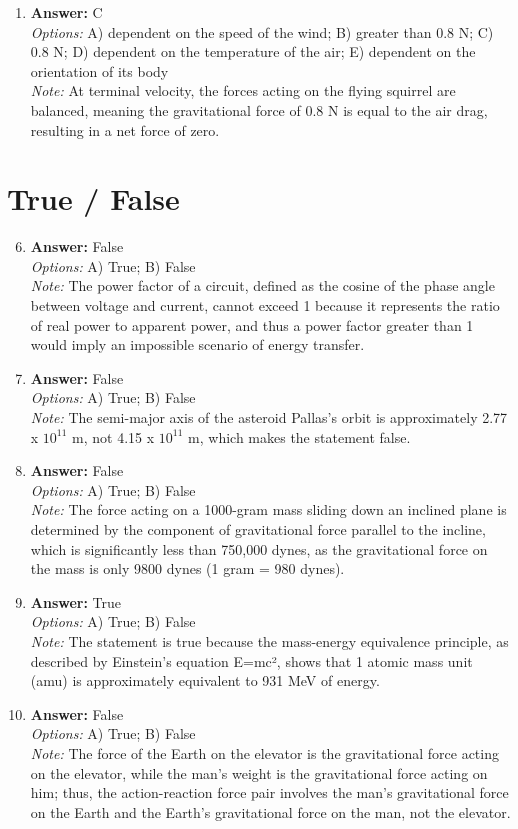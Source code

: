 \documentclass[12pt]{article}
\begin{document}
\begin{enumerate}[label=\arabic*.]
\item \textbf{Answer:} C
\\ \textit{Options:} A) dependent on the speed of the wind; B) greater than 0.8 N; C) 0.8 N; D) dependent on the temperature of the air; E) dependent on the orientation of its body
\\ \textit{Note:} At terminal velocity, the forces acting on the flying squirrel are balanced, meaning the gravitational force of 0.8 N is equal to the air drag, resulting in a net force of zero.
\end{enumerate}

\section*{True / False}
\begin{enumerate}[label=\arabic*.]
\setcounter{enumi}{5}
\item \textbf{Answer:} False
\\ \textit{Options:} A) True; B) False
\\ \textit{Note:} The power factor of a circuit, defined as the cosine of the phase angle between voltage and current, cannot exceed 1 because it represents the ratio of real power to apparent power, and thus a power factor greater than 1 would imply an impossible scenario of energy transfer.
\item \textbf{Answer:} False
\\ \textit{Options:} A) True; B) False
\\ \textit{Note:} The semi-major axis of the asteroid Pallas's orbit is approximately 2.77 x $10^11$ m, not 4.15 x $10^11$ m, which makes the statement false.
\item \textbf{Answer:} False
\\ \textit{Options:} A) True; B) False
\\ \textit{Note:} The force acting on a 1000-gram mass sliding down an inclined plane is determined by the component of gravitational force parallel to the incline, which is significantly less than 750,000 dynes, as the gravitational force on the mass is only 9800 dynes (1 gram = 980 dynes).
\item \textbf{Answer:} True
\\ \textit{Options:} A) True; B) False
\\ \textit{Note:} The statement is true because the mass-energy equivalence principle, as described by Einstein's equation E=mc², shows that 1 atomic mass unit (amu) is approximately equivalent to 931 MeV of energy.
\item \textbf{Answer:} False
\\ \textit{Options:} A) True; B) False
\\ \textit{Note:} The force of the Earth on the elevator is the gravitational force acting on the elevator, while the man's weight is the gravitational force acting on him; thus, the action-reaction force pair involves the man's gravitational force on the Earth and the Earth's gravitational force on the man, not the elevator.
\end{enumerate}
\end{document}

